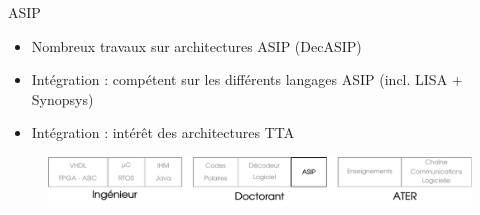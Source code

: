\documentclass[t,compress,mathserif,12pt,xcolor=dvipsnames]{beamer}
\begin{document}
\begin{frame}[t]{ASIP}
  \begin{minipage}[t][5.0cm][t]{\textwidth}
    \begin{itemize}
      \item<+-> Nombreux travaux sur architectures ASIP (DecASIP)
      \item<+-> Intégration : compétent sur les différents langages ASIP (incl. LISA + Synopsys)
      \item<+-> Intégration : intérêt des architectures TTA
    \end{itemize}
  \end{minipage}
  \begin{figure}[htp]
    \centering
    \includegraphics[width=\textwidth]{fig/frise22}
  \end{figure}
\end{frame}
\end{document}

